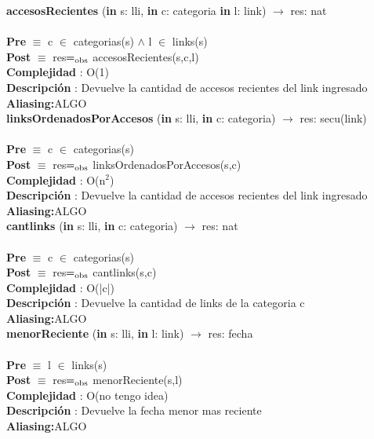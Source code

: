 \documentclass[10pt, a4paper]{article}
\begin{document}
	\textbf{accesosRecientes} (\textbf{in} s: lli, \textbf{in} c: categoria \textbf{in} l: link) $\longrightarrow$ res: nat\\\\
	\textbf{Pre} $\equiv$ {c $\in$ categorias(s) $\wedge$ l $\in$ links(s)}\\
	\textbf{Post} $\equiv$ {res$=_{\mathrm{obs}}$ accesosRecientes(s,c,l)}\\
	\textbf{Complejidad} : O(1)\\
	\textbf{Descripci\'{o}n} : Devuelve la cantidad de accesos recientes del link ingresado\\
	\textbf{Aliasing:}ALGO \\
	
	\textbf{linksOrdenadosPorAccesos} (\textbf{in} s: lli, \textbf{in} c: categoria) $\longrightarrow$ res: secu(link)\\\\
	\textbf{Pre} $\equiv$ {c $\in$ categorias(s)}\\
	\textbf{Post} $\equiv$ {res$=_{\mathrm{obs}}$ linksOrdenadosPorAccesos(s,c)}\\
	\textbf{Complejidad} : O(n${^2}$)\\
	\textbf{Descripci\'{o}n} : Devuelve la cantidad de accesos recientes del link ingresado\\
	\textbf{Aliasing:}ALGO \\
	
	\textbf{cantlinks} (\textbf{in} s: lli, \textbf{in} c: categoria) $\longrightarrow$ res: nat\\\\
	\textbf{Pre} $\equiv$ {c $\in$ categorias(s)}\\
	\textbf{Post} $\equiv$ {res$=_{\mathrm{obs}}$ cantlinks(s,c)}\\
	\textbf{Complejidad} : O(|c|)\\
	\textbf{Descripci\'{o}n} : Devuelve la cantidad de links de la categoria c\\
	\textbf{Aliasing:}ALGO \\
	
	\textbf{menorReciente} (\textbf{in} s: lli, \textbf{in} l: link) $\longrightarrow$ res: fecha\\\\
	\textbf{Pre} $\equiv$ {l $\in$ links(s)}\\
	\textbf{Post} $\equiv$ {res$=_{\mathrm{obs}}$ menorReciente(s,l)}\\
	\textbf{Complejidad} : O(no tengo idea)\\
	\textbf{Descripci\'{o}n} : Devuelve la fecha menor mas reciente\\
	\textbf{Aliasing:}ALGO \\
	
\end{document}
